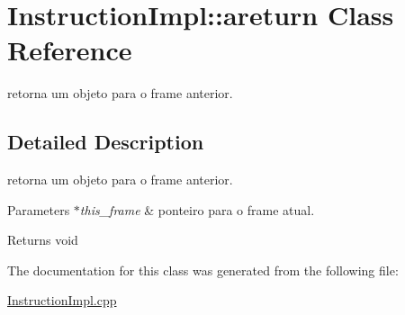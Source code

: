 \hypertarget{class_instruction_impl_1_1areturn}{}\section{Instruction\+Impl\+:\+:areturn Class Reference}
\label{class_instruction_impl_1_1areturn}


retorna um objeto para o frame anterior.  




\subsection{Detailed Description}
retorna um objeto para o frame anterior. 


\begin{DoxyParams}{Parameters}
{\em $\ast$this\+\_\+frame} & ponteiro para o frame atual. \\
\hline
\end{DoxyParams}
\begin{DoxyReturn}{Returns}
void 
\end{DoxyReturn}


The documentation for this class was generated from the following file\+:\begin{DoxyCompactItemize}
\item 
\hyperlink{_instruction_impl_8cpp}{Instruction\+Impl.\+cpp}\end{DoxyCompactItemize}
